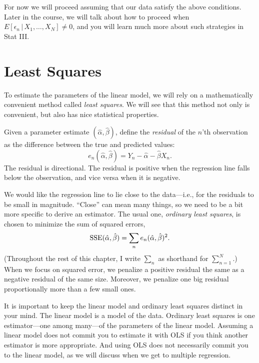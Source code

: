 \documentclass[
  12pt,
  oneside,openany]{book}
\begin{document}
For now we will proceed assuming that our data satisfy the above conditions. Later in the course, we will talk about how to proceed when \(E[\epsilon_n \,|\, X_1, \ldots, X_N] \neq 0\), and you will learn much more about such strategies in Stat III.

\hypertarget{least-squares}{%
\section{Least Squares}\label{least-squares}}

To estimate the parameters of the linear model, we will rely on a mathematically convenient method called \emph{least squares}. We will see that this method not only is convenient, but also has nice statistical properties.

Given a parameter estimate \((\hat{\alpha}, \hat{\beta})\), define the \emph{residual} of the \(n\)'th observation as the difference between the true and predicted values:
\begin{equation}
e_n(\hat{\alpha}, \hat{\beta}) = Y_n - \hat{\alpha} - \hat{\beta} X_n.
\end{equation}
The residual is directional. The residual is positive when the regression line falls below the observation, and vice versa when it is negative.

We would like the regression line to lie close to the data---i.e., for the residuals to be small in magnitude. ``Close'' can mean many things, so we need to be a bit more specific to derive an estimator. The usual one, \emph{ordinary least squares}, is chosen to minimize the sum of squared errors,
\[
\mathop{\rm SSE}\nolimits(\hat{\alpha}, \hat{\beta}) = \sum_n e_n(\hat{\alpha}, \hat{\beta})^2.
\]
(Throughout the rest of this chapter, I write \(\sum_n\) as shorthand for \(\sum_{n=1}^N\).) When we focus on squared error, we penalize a positive residual the same as a negative residual of the same size. Moreover, we penalize one big residual proportionally more than a few small ones.

It is important to keep the linear model and ordinary least squares distinct in your mind. The linear model is a model of the data. Ordinary least squares is one estimator---one among many---of the parameters of the linear model. Assuming a linear model does not commit you to estimate it with OLS if you think another estimator is more appropriate. And using OLS does not necessarily commit you to the linear model, as we will discuss when we get to multiple regression.
\end{document}

